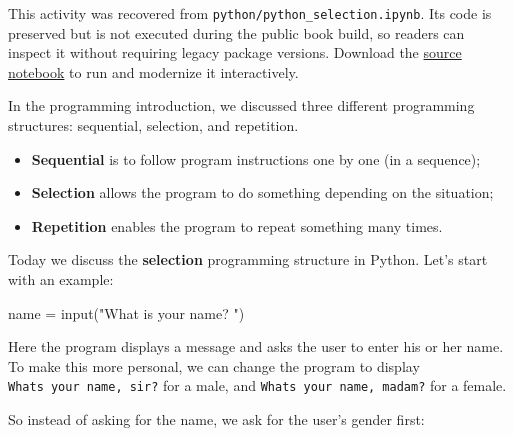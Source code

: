 \documentclass[
  letterpaper,
]{scrbook}
\newenvironment{Shaded}{\begin{snugshade}}{\end{snugshade}}
\newcommand{\BuiltInTok}[1]{\textcolor[rgb]{0.00,0.23,0.31}{#1}}
\newcommand{\NormalTok}[1]{\textcolor[rgb]{0.00,0.23,0.31}{#1}}
\newcommand{\OperatorTok}[1]{\textcolor[rgb]{0.37,0.37,0.37}{#1}}
\newcommand{\StringTok}[1]{\textcolor[rgb]{0.13,0.47,0.30}{#1}}
\providecommand{\tightlist}{%
  \setlength{\itemsep}{0pt}\setlength{\parskip}{0pt}}
\begin{document}
\begin{tcolorbox}[enhanced jigsaw, arc=.35mm, bottomrule=.15mm, bottomtitle=1mm, breakable, colback=white, colbacktitle=quarto-callout-note-color!10!white, colframe=quarto-callout-note-color-frame, coltitle=black, left=2mm, leftrule=.75mm, opacityback=0, opacitybacktitle=0.6, rightrule=.15mm, title=\textcolor{quarto-callout-note-color}{\faInfo}\hspace{0.5em}{Historical source and execution note}, titlerule=0mm, toprule=.15mm, toptitle=1mm]

This activity was recovered from
\texttt{python/python\_selection.ipynb}. Its code is preserved but is
not executed during the public book build, so readers can inspect it
without requiring legacy package versions. Download the
\href{../notebooks/python-selection.ipynb}{source notebook} to run and
modernize it interactively.

\end{tcolorbox}

In the programming introduction, we discussed three different
programming structures: sequential, selection, and repetition.

\begin{itemize}
\tightlist
\item
  \textbf{Sequential} is to follow program instructions one by one (in a
  sequence);
\item
  \textbf{Selection} allows the program to do something depending on the
  situation;
\item
  \textbf{Repetition} enables the program to repeat something many
  times.
\end{itemize}

Today we discuss the \textbf{selection} programming structure in Python.
Let's start with an example:

\begin{Shaded}
\begin{Highlighting}[]
\NormalTok{name }\OperatorTok{=} \BuiltInTok{input}\NormalTok{(}\StringTok{"What is your name? "}\NormalTok{)}
\end{Highlighting}
\end{Shaded}

Here the program displays a message and asks the user to enter his or
her name. To make this more personal, we can change the program to
display \texttt{What\textquotesingle{}s\ your\ name,\ sir?} for a male,
and \texttt{What\textquotesingle{}s\ your\ name,\ madam?} for a female.

So instead of asking for the name, we ask for the user's gender first:
\end{document}
